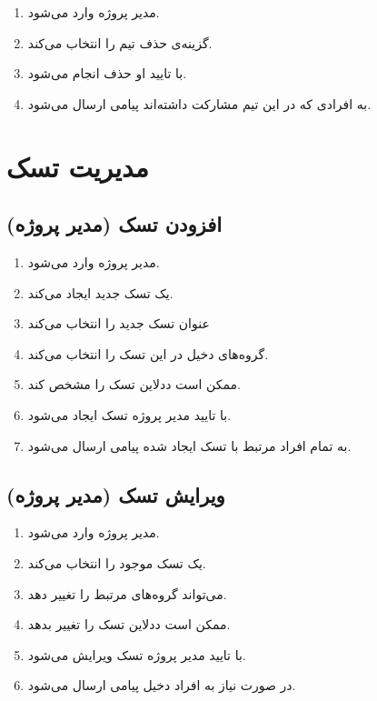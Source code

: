 \documentclass[10pt,a4paper]{article}
\begin{document}
\begin{enumerate}
	\item 
	مدیر پروژه وارد می‌شود.
	\item
	گزینه‌ی حذف تیم را انتخاب می‌کند.
	\item
	با تایید او حذف انجام می‌شود.
	\item
	به افرادی که در این تیم مشارکت داشته‌اند پیامی ارسال می‌شود.
\end{enumerate}


	\section{
	مدیریت تسک
}
\subsection{
افزودن تسک (مدیر پروژه)
}
\begin{enumerate}
	\item 
	 مدیر پروژه وارد می‌شود.
	 \item
	 یک تسک جدید ایجاد می‌کند.
	 \item
	 عنوان تسک جدید را انتخاب می‌کند
	 \item
	 گروه‌های دخیل در این تسک را انتخاب می‌کند.
	 \item
	 ممکن است ددلاین تسک را مشخص کند.
	 \item
	 با تایید مدیر پروژه تسک ایجاد می‌شود.
	 \item
	 به تمام افراد مرتبط با تسک ایجاد شده پیامی ارسال می‌شود.
\end{enumerate}

\subsection{
	ویرایش تسک (مدیر پروژه)
}

\begin{enumerate}
	\item 
	مدیر پروژه وارد می‌شود.
	\item
	یک تسک موجود را انتخاب می‌کند.
	\item
	می‌تواند گروه‌های مرتبط را تغییر دهد.
	\item
	ممکن است ددلاین تسک را تغییر بدهد.
	\item
	با تایید مدیر پروژه تسک ویرایش می‌شود.
	\item
	در صورت نیاز به افراد دخیل پیامی ارسال می‌شود.
\end{enumerate}
\end{document}
